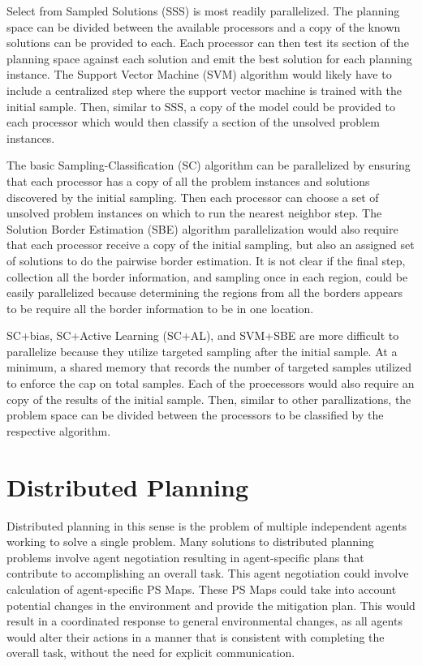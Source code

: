Select from Sampled Solutions (SSS) is most readily parallelized.  The planning space can be divided between the available processors and a copy of the known solutions can be provided to each.  Each processor can then test its section of the planning space against each solution and emit the best solution for each planning instance.  The Support Vector Machine (SVM) algorithm would likely have to include a centralized step where the support vector machine is trained with the initial sample.  Then, similar to SSS, a copy of the model could be provided to each processor which would then classify a section of the unsolved problem instances.

The basic Sampling-Classification (SC) algorithm can be parallelized by ensuring that each processor has a copy of all the problem instances and solutions discovered by the initial sampling.  Then each processor can choose a set of unsolved problem instances on which to run the nearest neighbor step.  The Solution Border Estimation (SBE) algorithm parallelization would also require that each processor receive a copy of the initial sampling, but also an assigned set of solutions to do the pairwise border estimation.  It is not clear if the final step, collection all the border information, and sampling once in each region, could be easily parallelized because determining the regions from all the borders appears to be require all the border information to be in one location.

SC+bias, SC+Active Learning (SC+AL), and SVM+SBE are more difficult to parallelize because they utilize targeted sampling after the initial sample.  At a minimum, a shared memory that records the number of targeted samples utilized to enforce the cap on total samples.  Each of the proecessors would also require an copy of the results of the initial sample. Then, similar to other parallizations, the problem space can be divided between the processors to be classified by the respective algorithm.





\section{Distributed Planning}

Distributed planning in this sense is the problem of  multiple independent agents working to solve a single problem.  Many solutions to distributed planning problems involve agent negotiation resulting in agent-specific plans that contribute to accomplishing an overall task.  This agent negotiation could involve calculation of agent-specific PS Maps.  These PS Maps could take into account potential changes in the environment and provide the mitigation plan.  This would result in a coordinated response to general environmental changes, as all agents  would alter their actions in a manner that is consistent with completing the overall task, without the need for explicit communication.

